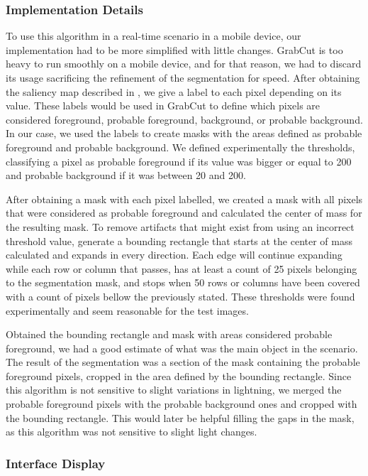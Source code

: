 \subsubsection{Implementation Details}

To use this algorithm in a real-time scenario in a mobile device, our implementation had to be more simplified with little changes. GrabCut is too heavy to run smoothly on a mobile device, and for that reason, we had to discard its usage sacrificing the refinement of the segmentation for speed. After obtaining the saliency map described in \cite{cheng2011global}, we give a label to each pixel depending on its value. These labels would be used in GrabCut to define which pixels are considered foreground, probable foreground, background, or probable background. In our case, we used the labels to create masks with the areas defined as probable foreground and probable background.
We defined experimentally the thresholds, classifying a pixel as probable foreground if its value was bigger or equal to 200 and probable background if it was between 20 and 200.

After obtaining a mask with each pixel labelled, we created a mask with all pixels that were considered as probable foreground and calculated the center of mass for the resulting mask. To remove artifacts that might exist from using an incorrect threshold value, generate a bounding rectangle that starts at the center of mass calculated and expands in every direction. Each edge will continue expanding while each row or column that passes, has at least a count of 25 pixels belonging to the segmentation mask, and stops when 50 rows or columns have been covered with a count of pixels bellow the previously stated. These thresholds were found experimentally and seem reasonable for the test images.

Obtained the bounding rectangle and mask with areas considered probable foreground, we had a good estimate of what was the main object in the scenario. The result of the segmentation was a section of the mask containing the probable foreground pixels, cropped in the area defined by the bounding rectangle. Since this algorithm is not sensitive to slight variations in lightning, we merged the probable foreground pixels with the probable background ones and cropped with the bounding rectangle. This would later be helpful filling the gaps in the mask, as this algorithm was not sensitive to slight light changes.

\subsubsection{Interface Display}

